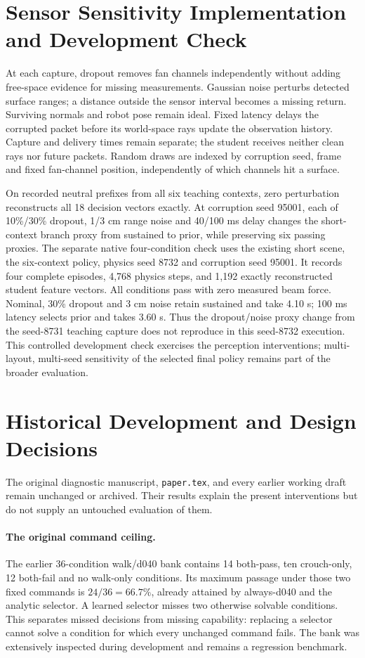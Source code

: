 \section{Sensor Sensitivity Implementation and Development Check}
\label{app:sensors}
At each capture, dropout removes fan channels independently without adding
free-space evidence for missing measurements. Gaussian noise perturbs detected
surface ranges; a distance outside the sensor interval becomes a missing return.
Surviving normals and robot pose remain ideal. Fixed latency delays the corrupted
packet before its world-space rays update the observation history. Capture and
delivery times remain separate; the student receives neither clean rays nor
future packets. Random draws are indexed by corruption seed, frame and fixed
fan-channel position, independently of which channels hit a surface.

On recorded neutral prefixes from all six teaching contexts, zero perturbation
reconstructs all 18 decision vectors exactly. At corruption seed 95001, each of
10\%/30\% dropout, 1/3 cm range noise and 40/100 ms delay changes the short-context
branch proxy from sustained to prior, while preserving six passing proxies.
The separate native four-condition check uses the existing short scene, the
six-context policy, physics seed 8732 and corruption seed 95001. It records four
complete episodes, 4,768 physics steps, and 1,192 exactly reconstructed student
feature vectors. All conditions pass with zero measured beam force. Nominal,
30\% dropout and 3 cm noise retain sustained and take 4.10 s; 100 ms latency
selects prior and takes 3.60 s. Thus the dropout/noise proxy change from the
seed-8731 teaching capture does not reproduce in this seed-8732 execution.
This controlled development check exercises the perception interventions;
multi-layout, multi-seed sensitivity of the selected final policy remains part
of the broader evaluation.

\section{Historical Development and Design Decisions}
\label{app:history}
The original diagnostic manuscript, \texttt{paper.tex}, and every earlier
working draft remain unchanged or archived. Their results explain the present
interventions but do not supply an untouched evaluation of them.

\paragraph{The original command ceiling.}
The earlier 36-condition walk/d040 bank contains 14 both-pass, ten crouch-only,
12 both-fail and no walk-only conditions. Its maximum passage under those two
fixed commands is $24/36=66.7\%$, already attained by always-d040 and the analytic
selector. A learned selector misses two otherwise solvable conditions.
This separates missed decisions from missing capability: replacing a selector
cannot solve a condition for which every unchanged command fails. The bank was
extensively inspected during development and remains a regression benchmark.

